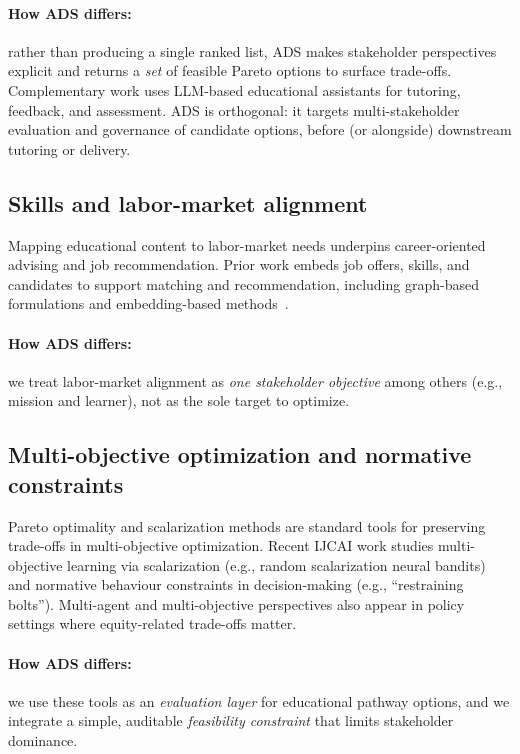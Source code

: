 \documentclass[sigconf,review]{acmart}
\newcommand{\ADS}{\textsc{ADS}\xspace}
\begin{document}
\paragraph{How ADS differs:} rather than producing a single ranked list, \ADS makes stakeholder perspectives explicit and returns a \emph{set} of feasible Pareto options to surface trade-offs.
Complementary work uses LLM-based educational assistants for tutoring, feedback, and assessment.\cite{coderagent2025,collabAgents2025,llmGrading2025,handByHand2025,livepoem2025} \ADS is orthogonal: it targets multi-stakeholder evaluation and governance of candidate options, before (or alongside) downstream tutoring or delivery.

\subsection{Skills and labor-market alignment}
Mapping educational content to labor-market needs underpins career-oriented advising and job recommendation. Prior work embeds job offers, skills, and candidates to support matching and recommendation, including graph-based formulations and embedding-based methods~\cite{giabelli2021skills2job,kara2022skillEmbeddings,leon2024transversalSkills}.

\paragraph{How ADS differs:} we treat labor-market alignment as \emph{one stakeholder objective} among others (e.g., mission and learner), not as the sole target to optimize.

\subsection{Multi-objective optimization and normative constraints}
Pareto optimality and scalarization methods are standard tools for preserving trade-offs in multi-objective optimization.\cite{roijers2013survey_mosdm,deb2002nsga2}
Recent IJCAI work studies multi-objective learning via scalarization (e.g., random scalarization neural bandits) and normative behaviour constraints in decision-making (e.g., ``restraining bolts'').\cite{monb2025,restrainingBolts2025}
Multi-agent and multi-objective perspectives also appear in policy settings where equity-related trade-offs matter.\cite{equityMAMORL2025}
\paragraph{How ADS differs:} we use these tools as an \emph{evaluation layer} for educational pathway options, and we integrate a simple, auditable \emph{feasibility constraint} that limits stakeholder dominance.
\end{document}
